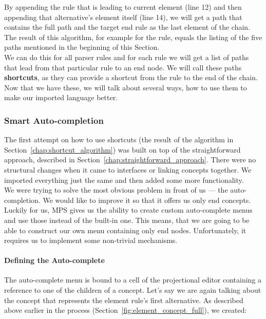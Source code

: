 By appending the rule that is leading to current element (line 12) and then appending that alternative's element itself (line 14), we will get a path that contains the full path and the target end rule as the last element of the chain.
The result of this algorithm, for example for the  rule, equals the listing of the five paths mentioned in the beginning of this Section.
\\

We can do this for all parser rules and for each rule we will get a list of paths that lead from that particular rule to an end node.
We will call these paths \textbf{shortcuts}, as they can provide a shortcut from the rule to the end of the chain.
Now that we have these, we will talk about several ways, how to use them to make our imported language better.

\subsubsection{Smart Auto-completion}

The first attempt on how to use shortcuts (the result of the algorithm in Section~\ref{chap:shortcut_algorithm}) was built on top of the straightforward approach, described in Section~\ref{chap:straightforward_approach}.
There were no structural changes when it came to interfaces or linking concepts together.
We imported everything just the same and then added some more functionality.
\\

We were trying to solve the most obvious problem in front of us --- the auto-completion.
We would like to improve it so that it offers us only end concepts.
Luckily for us, MPS gives us the ability to create custom auto-complete menus and use those instead of the built-in one.
This means, that we are going to be able to construct our own menu containing only end nodes.
Unfortunately, it requires us to implement some non-trivial mechanisms.

\paragraph{Defining the Auto-complete}

The auto-complete menu is bound to a cell of the projectional editor containing a reference to one of the children of a concept.
Let's say we are again talking about the concept that represents the element rule's first alternative.
As described above earlier in the process (Section~\ref{fig:element_concept_full}), we created:

